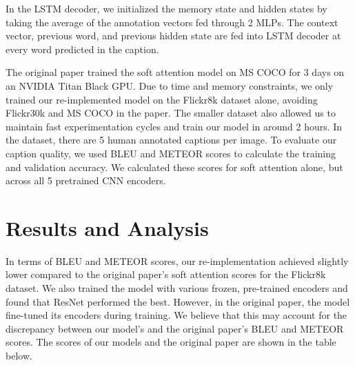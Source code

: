 \documentclass{article}
\begin{document}
In the LSTM decoder, we initialized the memory state and hidden states by taking the average of the annotation vectors fed through 2 MLPs. The context vector, previous word, and previous hidden state are fed into LSTM decoder at every word predicted in the caption.

The original paper trained the soft attention model on MS COCO for 3 days on an NVIDIA Titan Black GPU. Due to time and memory constraints, we only trained our re-implemented model on the Flickr8k dataset alone, avoiding Flickr30k and MS COCO in the paper. The smaller dataset also allowed us to maintain fast experimentation cycles and train our model in around 2 hours. In the dataset, there are 5 human annotated captions per image. To evaluate our caption quality, we used BLEU and METEOR scores to calculate the training and validation accuracy. We calculated these scores for soft attention alone, but across all 5 pretrained CNN encoders.


\section{Results and Analysis}


In terms of BLEU and METEOR scores, our re-implementation achieved slightly lower compared to the original paper's soft attention scores for the Flickr8k dataset. We also trained the model with various frozen, pre-trained encoders and found that ResNet performed the best. However, in the original paper, the model fine-tuned its encoders during training. We believe that this may account for the discrepancy between our model's and the original paper's BLEU and METEOR scores. The scores of our models and the original paper are shown in the table below.
\end{document}
